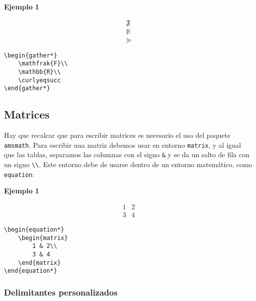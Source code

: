 \textbf{Ejemplo 1}

\begin{gather*}
	\mathfrak{F}\\
	\mathbb{R}\\
	\curlyeqsucc	
\end{gather*}

\begin{myquote}
	\begin{lstlisting}
\begin{gather*}
	\mathfrak{F}\\
	\mathbb{R}\\
	\curlyeqsucc	
\end{gather*}
	\end{lstlisting}
\end{myquote}

\subsection{Matrices}

Hay que recalcar que para escribir matrices es necesario el uso del paquete \texttt{amsmath}. Para escribir una matriz debemos usar en entorno \texttt{matrix}, y al igual que las tablas, separamos las columnas con el signo \verb*|&| y se da un salto de fila con un signo \verb*|\\|. Este entorno debe de usarse dentro de un entorno matemático, como \texttt{equation}:

\textbf{Ejemplo 1}

\begin{equation*}
	\begin{matrix}
		1 & 2\\
		3 & 4
	\end{matrix}	
\end{equation*}

\begin{myquote}
	\begin{lstlisting}
\begin{equation*}
	\begin{matrix}
		1 & 2\\
		3 & 4
	\end{matrix}	
\end{equation*}
	\end{lstlisting}
\end{myquote}

\subsubsection{Delimitantes personalizados}

